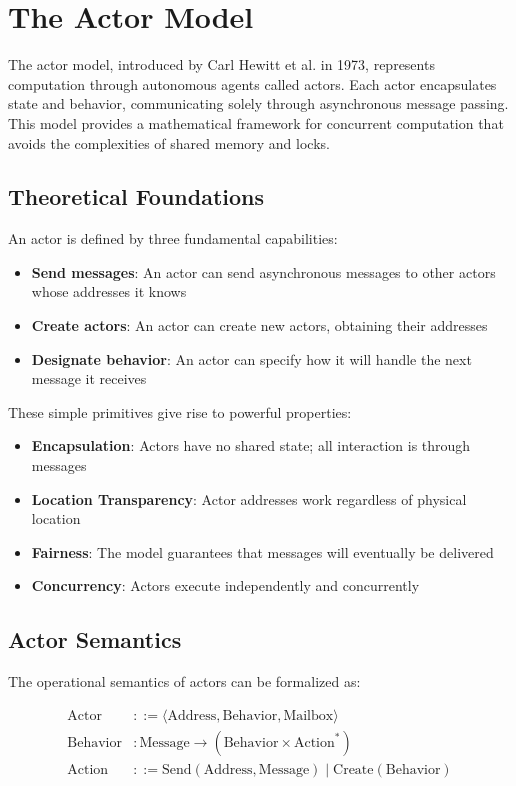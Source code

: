 \documentclass[12pt,a4paper]{report}
\begin{document}
\section{The Actor Model}

The actor model, introduced by Carl Hewitt et al. in 1973, represents computation through autonomous agents called actors. Each actor encapsulates state and behavior, communicating solely through asynchronous message passing. This model provides a mathematical framework for concurrent computation that avoids the complexities of shared memory and locks.

\subsection{Theoretical Foundations}

An actor is defined by three fundamental capabilities:
\begin{itemize}
\item \textbf{Send messages}: An actor can send asynchronous messages to other actors whose addresses it knows
\item \textbf{Create actors}: An actor can create new actors, obtaining their addresses
\item \textbf{Designate behavior}: An actor can specify how it will handle the next message it receives
\end{itemize}

These simple primitives give rise to powerful properties:
\begin{itemize}
\item \textbf{Encapsulation}: Actors have no shared state; all interaction is through messages
\item \textbf{Location Transparency}: Actor addresses work regardless of physical location
\item \textbf{Fairness}: The model guarantees that messages will eventually be delivered
\item \textbf{Concurrency}: Actors execute independently and concurrently
\end{itemize}

\subsection{Actor Semantics}

The operational semantics of actors can be formalized as:

\begin{align}
\text{Actor} &::= \langle \text{Address}, \text{Behavior}, \text{Mailbox} \rangle \\
\text{Behavior} &: \text{Message} \rightarrow (\text{Behavior} \times \text{Action}^*) \\
\text{Action} &::= \text{Send}(\text{Address}, \text{Message}) \mid \text{Create}(\text{Behavior})
\end{align}
\end{document}
